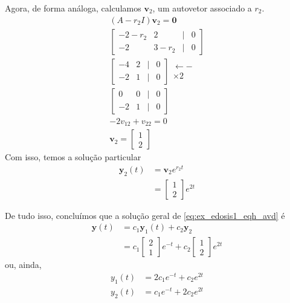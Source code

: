 \begin{ex}
Agora, de forma análoga, calculamos $\pmb{v}_2$, um autovetor associado a $r_2$.
\begin{gather}
  (A-r_2I)\pmb{v}_2 = \pmb{0} \\
  \begin{bmatrix}
    -2-r_2 & 2 & | & 0 \\
    -2 & 3-r_2 & | & 0
  \end{bmatrix} \\
  \begin{bmatrix}
    -4 & 2 & | & 0 \\
    -2 & 1 & | & 0
  \end{bmatrix}
  \begin{matrix}
    \leftarrow - \\
    \times 2
  \end{matrix}\\
  \begin{bmatrix}
    0 & 0 & | & 0 \\
    -2 & 1 & | & 0
  \end{bmatrix}\\
    -2v_{12} + v_{22} = 0 \\
  \pmb{v}_2 =
  \begin{bmatrix}
    1 \\
    2
  \end{bmatrix}
\end{gather}
Com isso, temos a solução particular
\begin{align}
  \pmb{y}_2(t) &= \pmb{v}_2e^{r_2t} \\
               &=
                 \begin{bmatrix}
                   1\\
                   2
                 \end{bmatrix}e^{2t}
\end{align}

De tudo isso, concluímos que a solução geral de \eqref{eq:ex_edosis1_eqh_avd} é
\begin{align}
  \pmb{y}(t) &= c_1\pmb{y}_1(t) + c_2\pmb{y}_2 \\
             &= c_1
               \begin{bmatrix}
                 2\\
                 1
               \end{bmatrix}e^{-t} + c_2
  \begin{bmatrix}
    1\\
    2
  \end{bmatrix}e^{2t}
\end{align}
ou, ainda,
\begin{align}
  y_1(t) &= 2c_1e^{-t} + c_2e^{2t} \\
  y_2(t) &= c_1e^{-t} + 2c_2e^{2t}
\end{align}


\end{ex}
